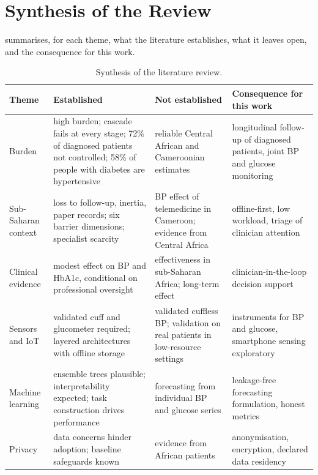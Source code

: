 \section{Synthesis of the Review}\label{sec:lr-synthesis}

 summarises, for each theme, what the literature establishes, what it leaves open, and the consequence for this work.

\begin{table}[htbp]
\centering\footnotesize
\caption{Synthesis of the literature review.}\label{tab:lr-synthesis}
\begin{tabularx}{\textwidth}{@{}>{\raggedright\arraybackslash}p{2.3cm} >{\raggedright\arraybackslash}X >{\raggedright\arraybackslash}X >{\raggedright\arraybackslash}X@{}}
\toprule
\textbf{Theme} & \textbf{Established} & \textbf{Not established} & \textbf{Consequence for this work} \\
\midrule
Burden & high burden; cascade fails at every stage; 72\% of diagnosed patients not controlled; 58\% of people with diabetes are hypertensive & reliable Central African and Cameroonian estimates & longitudinal follow-up of diagnosed patients, joint BP and glucose monitoring \\
Sub-Saharan context & loss to follow-up, inertia, paper records; six barrier dimensions; specialist scarcity & BP effect of telemedicine in Cameroon; evidence from Central Africa & offline-first, low workload, triage of clinician attention \\
Clinical evidence & modest effect on BP and HbA1c, conditional on professional oversight & effectiveness in sub-Saharan Africa; long-term effect & clinician-in-the-loop decision support \\
Sensors and IoT & validated cuff and glucometer required; layered architectures with offline storage & validated cuffless BP; validation on real patients in low-resource settings & instruments for BP and glucose, smartphone sensing exploratory \\
Machine learning & ensemble trees plausible; interpretability expected; task construction drives performance & forecasting from individual BP and glucose series & leakage-free forecasting formulation, honest metrics \\
Privacy & data concerns hinder adoption; baseline safeguards known & evidence from African patients & anonymisation, encryption, declared data residency \\
\bottomrule
\end{tabularx}
\end{table}

